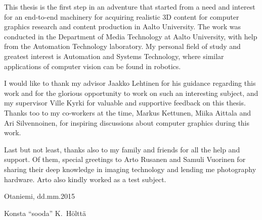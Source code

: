 This thesis is the first step in an adventure that started from a need and interest for an end-to-end machinery for acquiring realistic 3D content for computer graphics research and content production in Aalto University.
The work was conducted in the Department of Media Technology at Aalto University, with help from the Automation Technology laboratory.
My personal field of study and greatest interest is Automation and Systems Technology, where similar applications of computer vision can be found in robotics.

I would like to thank my advisor Jaakko Lehtinen for his guidance regarding this work and for the glorious opportunity to work on such an interesting subject, and my supervisor Ville Kyrki for valuable and supportive feedback on this thesis.
Thanks too to my co-workers at the time, Markus Kettunen, Miika Aittala and Ari Silvennoinen, for inspiring discussions about computer graphics during this work.

Last but not least, thanks also to my family and friends for all the help and support.
Of them, special greetings to Arto Rusanen and Samuli Vuorinen for sharing their deep knowledge in imaging technology and lending me photography hardware.
Arto also kindly worked as a test subject.

\vspace{5cm}
Otaniemi, dd.mm.2015

\vspace{5mm}
{\hfill Konsta ``sooda'' K.\ Hölttä \hspace{1cm}}

